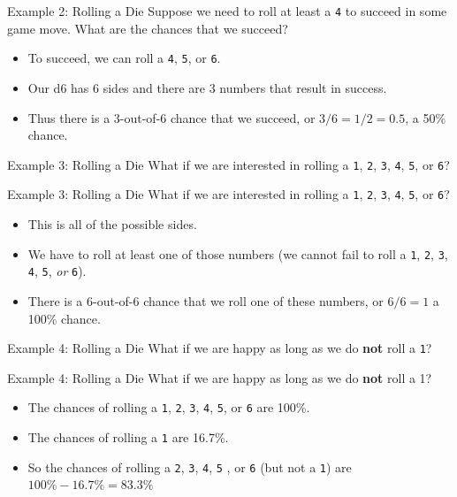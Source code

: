 \begin{frame}{Example 2: Rolling a Die}
    Suppose we need to roll at least a \texttt{4} to succeed in some game move. What are the chances that we succeed?
    \begin{itemize}
        \item To succeed, we can roll a \texttt{4}, \texttt{5}, or \texttt{6}.
        \item Our d6 has 6 sides and there are 3 numbers that result in success.
        \item Thus there is a 3-out-of-6 chance that we succeed, or $3/6 = 1/2 = 0.5$, a 50\% chance.
    \end{itemize}
\end{frame}

\begin{frame}{Example 3: Rolling a Die}
    What if we are interested in rolling a \texttt{1}, \texttt{2}, \texttt{3}, \texttt{4}, \texttt{5}, or \texttt{6}?
\end{frame}

\begin{frame}{Example 3: Rolling a Die}
    What if we are interested in rolling a \texttt{1}, \texttt{2}, \texttt{3}, \texttt{4}, \texttt{5}, or \texttt{6}?
    \begin{itemize}
        \item This is all of the possible sides.
        \item We have to roll at least one of those numbers (we cannot fail to roll a \texttt{1}, \texttt{2}, \texttt{3}, \texttt{4}, \texttt{5}, \textit{or} \texttt{6}).
        \item There is a 6-out-of-6 chance that we roll one of these numbers, or $6/6=1$ a 100\% chance.
    \end{itemize}
\end{frame}

\begin{frame}{Example 4: Rolling a Die}
    What if we are happy as long as we do \textbf{not} roll a \texttt{1}?
\end{frame}

\begin{frame}{Example 4: Rolling a Die}
    What if we are happy as long as we do \textbf{not} roll a 1?
    \begin{itemize}
        \item The chances of rolling a \texttt{1}, \texttt{2}, \texttt{3}, \texttt{4}, \texttt{5}, or \texttt{6} are 100\%.
        \item The chances of rolling a \texttt{1} are 16.7\%.
        \item So the chances of rolling a \texttt{2}, \texttt{3}, \texttt{4}, \texttt{5} , or \texttt{6} (but not a \texttt{1}) are $100\% - 16.7\% = 83.3\%$
    \end{itemize}
\end{frame}

